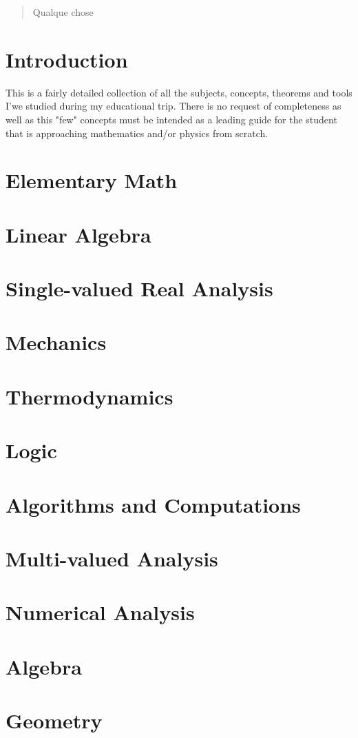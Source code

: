 \documentclass[10pt]{article}
\begin{document}
\begin{abstract}
	Qualque chose
\end{abstract}
\section*{Introduction}
This is a fairly detailed collection of all the subjects, concepts, theorems and tools I'we studied during my educational trip. There is no request of completeness as well as this "few" concepts must be intended as a leading guide for the student that is approaching mathematics and/or physics from scratch.
\section{Elementary Math}
\section{Linear Algebra}
\section{Single-valued Real Analysis}
\section{Mechanics}
\section{Thermodynamics}
\section{Logic}
\section{Algorithms and Computations}
\section{Multi-valued Analysis}
\section{Numerical Analysis}
\section{Algebra}
\section{Geometry}
\end{document}
